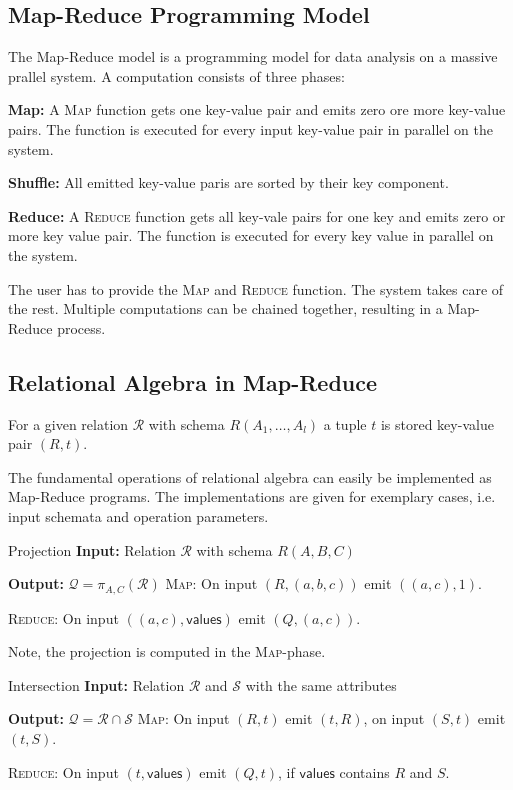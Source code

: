 \documentclass[english]{panikzettel}
\begin{document}
\subsection{Map-Reduce Programming Model}
The Map-Reduce model is a programming model for data analysis on a massive prallel system.
A computation consists of three phases:

\textbf{Map:} A \textsc{Map} function gets one key-value pair and emits zero ore more key-value pairs. The function is executed for every input key-value pair in parallel on the system.

\textbf{Shuffle:} All emitted key-value paris are sorted by their key component.

\textbf{Reduce:} A \textsc{Reduce} function gets all key-vale pairs for one key and emits zero or more key value pair. The function is executed for every key value in parallel on the system.

The user has to provide the \textsc{Map} and \textsc{Reduce} function. The system takes care of the rest.
Multiple computations can be chained together, resulting in a Map-Reduce process.


\subsection{Relational Algebra in Map-Reduce}
For a given relation $\mathcal{R}$ with schema $R(A_1, \ldots, A_l)$ a tuple $t$ is stored key-value pair $(R,t)$.

The fundamental operations of relational algebra can easily be implemented as Map-Reduce programs. The implementations are given for exemplary cases, i.e. input schemata and operation parameters.

\begin{algo}{Projection}
\textbf{Input:} Relation $\mathcal{R}$ with schema $R(A,B,C)$

\textbf{Output:} $\mathcal{Q} = \pi_{A,C}(\mathcal{R})$
\tcblower
\textsc{Map}: On input $(R,(a,b,c))$ emit $((a,c),1)$.

\textsc{Reduce}: On input $((a,c), \textsf{values})$ emit $(Q,(a,c))$.
\end{algo}

Note, the projection is computed in the \textsc{Map}-phase.

\begin{algo}{Intersection}
\textbf{Input:} Relation $\mathcal{R}$ and $\mathcal{S}$ with the same attributes

\textbf{Output:} $\mathcal{Q} = \mathcal{R} \cap \mathcal{S}$
\tcblower
\textsc{Map}: On input $(R,t)$ emit $(t,R)$, on input $(S,t)$ emit $(t,S)$.

\textsc{Reduce}: On input $(t, \textsf{values})$ emit $(Q,t)$, if $\textsf{values}$ contains $R$ and $S$.
\end{algo}
\end{document}
